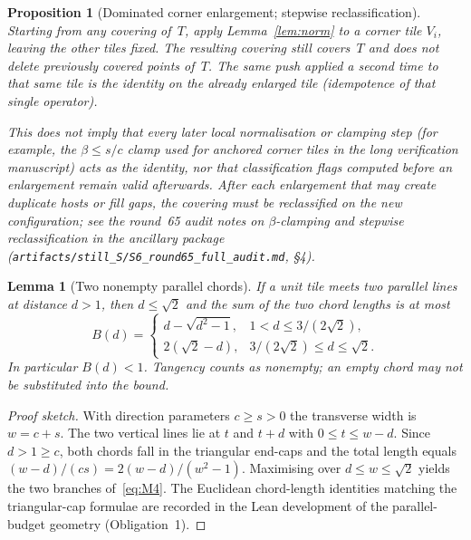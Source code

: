 \documentclass[11pt,reqno]{amsart}
\newtheorem{proposition}[theorem]{Proposition}
\newtheorem{lemma}[theorem]{Lemma}
\theoremstyle{definition}
\begin{document}
\begin{proposition}[Dominated corner enlargement; stepwise reclassification]\label{prop:M1}
Starting from any covering of~$T$, apply Lemma~\ref{lem:norm} to a corner tile
$V_i$, leaving the other tiles fixed.  The resulting covering still covers~$T$
and does not delete previously covered points of~$T$.  The same push applied a
second time to that same tile is the identity on the already enlarged tile
(idempotence of that single operator).

This does \emph{not} imply that every later local normalisation or clamping
step (for example, the $\beta\le s/c$ clamp used for anchored corner tiles in
the long verification manuscript) acts as the identity, nor that classification
flags computed before an enlargement remain valid afterwards.  After each
enlargement that may create duplicate hosts or fill gaps, the covering must be
\emph{reclassified} on the new configuration; see the round~65 audit notes on
$\beta$-clamping and stepwise reclassification in the ancillary package
(\texttt{artifacts/still\_S/S6\_round65\_full\_audit.md}, §4).
\end{proposition}

\begin{lemma}[Two nonempty parallel chords]\label{lem:B}
If a unit tile meets two parallel lines at distance $d>1$, then $d\le\sqrt2$
and the sum of the two chord lengths is at most
\begin{equation}\label{eq:M4}
B(d)=\begin{cases}
d-\sqrt{d^2-1},& 1<d\le 3/(2\sqrt2),\\
2(\sqrt2-d),& 3/(2\sqrt2)\le d\le\sqrt2.
\end{cases}
\end{equation}
In particular $B(d)<1$.  Tangency counts as nonempty; an empty chord may not
be substituted into the bound.
\end{lemma}

\begin{proof}[Proof sketch]
With direction parameters $c\ge s>0$ the transverse width is $w=c+s$.  The two
vertical lines lie at $t$ and $t+d$ with $0\le t\le w-d$.  Since $d>1\ge c$,
both chords fall in the triangular end-caps and the total length equals
$(w-d)/(cs)=2(w-d)/(w^2-1)$.  Maximising over $d\le w\le\sqrt2$ yields the
two branches of~\eqref{eq:M4}.  The Euclidean chord-length identities matching
the triangular-cap formulae are recorded in the Lean development of the
parallel-budget geometry (Obligation~1).
\end{proof}
\end{document}

